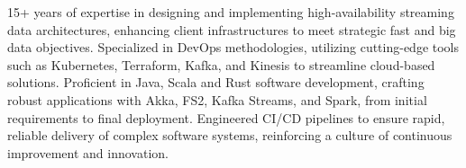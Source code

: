 

\begin{cvparagraph}

15+ years of expertise in designing and implementing high-availability streaming data architectures, enhancing client infrastructures to meet strategic fast and big data objectives. Specialized in DevOps methodologies, utilizing cutting-edge tools such as Kubernetes, Terraform, Kafka, and Kinesis to streamline cloud-based solutions. Proficient in Java, Scala and Rust software development, crafting robust applications with Akka, FS2, Kafka Streams, and Spark, from initial requirements to final deployment. Engineered CI/CD pipelines to ensure rapid, reliable delivery of complex software systems, reinforcing a culture of continuous improvement and innovation.
\end{cvparagraph}
